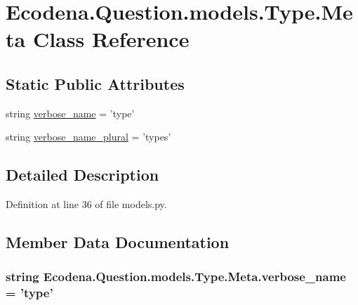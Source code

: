 \hypertarget{class_ecodena_1_1_question_1_1models_1_1_type_1_1_meta}{
\section{Ecodena.Question.models.Type.Meta Class Reference}
\label{db/d77/class_ecodena_1_1_question_1_1models_1_1_type_1_1_meta}
}
\subsection*{Static Public Attributes}
\begin{DoxyCompactItemize}
\item 
string \hyperlink{class_ecodena_1_1_question_1_1models_1_1_type_1_1_meta_a136574e864dc7276d163542c9c36308c}{verbose\_\-name} = 'type'
\item 
string \hyperlink{class_ecodena_1_1_question_1_1models_1_1_type_1_1_meta_ae1c74aca97a425904b8ee3026812fefe}{verbose\_\-name\_\-plural} = 'types'
\end{DoxyCompactItemize}


\subsection{Detailed Description}


Definition at line 36 of file models.py.



\subsection{Member Data Documentation}
\hypertarget{class_ecodena_1_1_question_1_1models_1_1_type_1_1_meta_a136574e864dc7276d163542c9c36308c}{
\subsubsection[{verbose\_\-name}]{\setlength{\rightskip}{0pt plus 5cm}string {\bf Ecodena.Question.models.Type.Meta.verbose\_\-name} = 'type'}}
\label{db/d77/class_ecodena_1_1_question_1_1models_1_1_type_1_1_meta_a136574e864dc7276d163542c9c36308c}


